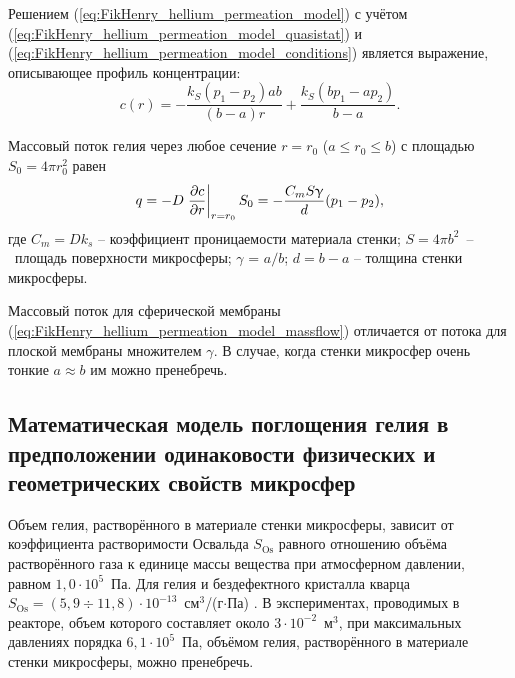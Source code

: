 Решением (\ref{eq:FikHenry_hellium_permeation_model}) с учётом (\ref{eq:FikHenry_hellium_permeation_model_quasistat}) и (\ref{eq:FikHenry_hellium_permeation_model_conditions}) является выражение, описывающее профиль концентрации:
\begin{equation}
\label{eq:eq:FikHenry_hellium_permeation_model_solution}
c(r) = -\frac{k_S(p_1-p_2)ab}{(b-a)r}+\frac{k_S(bp_1-ap_2)}{b-a}.
\end{equation}

Массовый поток гелия через любое сечение $r=r_0$ ($a\leq r_0 \leq b$) с площадью $S_0=4\pi r_0^2$ равен
\begin{equation}
\label{eq:FikHenry_hellium_permeation_model_massflow}
q = -D \left. \frac{\partial c}{\partial r} \right|_{r=r_0}S_0=-\frac{C_m S \upgamma}{d}(p_1-p_2),
\end{equation}
где $C_m = D k_s$ -- коэффициент проницаемости материала стенки; $S=4 \pi b^2$~--~площадь поверхности микросферы; $\gamma$ = $a/b$; $d=b-a$ -- толщина стенки микросферы.

Массовый поток для сферической мембраны (\ref{eq:FikHenry_hellium_permeation_model_massflow}) отличается от потока для плоской мембраны \cite{Hvang, Ditnerskiy, Mulder} множителем $\gamma$. В случае, когда стенки микросфер очень тонкие $a \approx b$ им можно пренебречь.

\subsection{Математическая модель поглощения гелия в предположении одинаковости физических и геометрических свойств микросфер}
 \label{section_2_1_2}

Объем гелия, растворённого в материале стенки микросферы, зависит от коэффициента растворимости Освальда $S_{\mathrm{Os}}$ равного отношению объёма растворённого газа к единице массы вещества при атмосферном давлении, равном $1,0 \cdot 10^5$~Па. Для гелия и бездефектного кристалла кварца $S_{\mathrm{Os}}=(5,9 \div 11,8) \cdot 10^{-13}$~см$^3$/(г$\cdot$Па) \cite{Argunova_Sorokin}. В экспериментах, проводимых в реакторе, объем которого составляет около $3\cdot 10^{-2}$~м$^3$, при максимальных давлениях порядка $6,1\cdot 10^5$~Па, объёмом гелия, растворённого в материале стенки микросферы, можно пренебречь.

